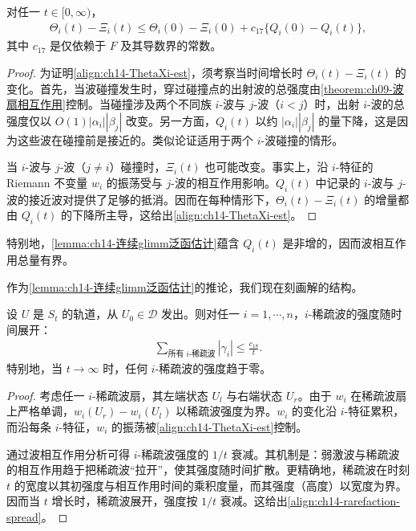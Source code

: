 \documentclass[../../main.tex]{subfiles}
\begin{document}
\begin{lemma}\label{lemma:ch14-连续glimm泛函估计}
对任一 $t\in[0,\infty)$，
\begin{align}
\Theta_i(t)-\Xi_i(t)\leqslant\Theta_i(0)-\Xi_i(0)+c_{17}\{Q_i(0)-Q_i(t)\},
\label{align:ch14-ThetaXi-est}
\end{align}
其中 $c_{17}$ 是仅依赖于 $F$ 及其导数界的常数。
\end{lemma}

\begin{proof}
为证明\eqref{align:ch14-ThetaXi-est}，须考察当时间增长时 $\Theta_i(t)-\Xi_i(t)$ 的变化。首先，当波碰撞发生时，穿过碰撞点的出射波的总强度由\cref{theorem:ch09-波扇相互作用}控制。当碰撞涉及两个不同族 $i$-波与 $j$-波（$i<j$）时，出射 $i$-波的总强度仅以 $O(1)|\alpha_i||\beta_j|$ 改变。另一方面，$Q_i(t)$ 以约 $|\alpha_i||\beta_j|$ 的量下降，这是因为这些波在碰撞前是接近的。类似论证适用于两个 $i$-波碰撞的情形。



当 $i$-波与 $j$-波（$j\neq i$）碰撞时，$\Xi_i(t)$ 也可能改变。事实上，沿 $i$-特征的 Riemann 不变量 $w_i$ 的振荡受与 $j$-波的相互作用影响。$Q_i(t)$ 中记录的 $i$-波与 $j$-波的接近波对提供了足够的抵消。因而在每种情形下，$\Theta_i(t)-\Xi_i(t)$ 的增量都由 $Q_i(t)$ 的下降所主导，这给出\eqref{align:ch14-ThetaXi-est}。
\end{proof}

特别地，\cref{lemma:ch14-连续glimm泛函估计}蕴含 $Q_i(t)$ 是非增的，因而波相互作用总量有界。

作为\cref{lemma:ch14-连续glimm泛函估计}的推论，我们现在刻画解的结构。

\begin{theorem}\label{theorem:ch14-稀疏波展开}
设 $U$ 是 $S_t$ 的轨道，从 $U_0\in\mathscr{D}$ 发出。则对任一 $i=1,\cdots,n$，$i$-稀疏波的强度随时间展开：
\begin{align}
\sum_{\text{所有 }i\text{-稀疏波}}|\gamma_i|\leqslant\frac{c_{18}}{t}.
\label{align:ch14-rarefaction-spread}
\end{align}
特别地，当 $t\to\infty$ 时，任何 $i$-稀疏波的强度趋于零。
\end{theorem}

\begin{proof}
考虑任一 $i$-稀疏波扇，其左端状态 $U_l$ 与右端状态 $U_r$。由于 $w_i$ 在稀疏波扇上严格单调，$w_i(U_r)-w_i(U_l)$ 以稀疏波强度为界。$w_i$ 的变化沿 $i$-特征累积，而沿每条 $i$-特征，$w_i$ 的振荡被\eqref{align:ch14-ThetaXi-est}控制。

通过波相互作用分析可得 $i$-稀疏波强度的 $1/t$ 衰减。其机制是：弱激波与稀疏波的相互作用趋于把稀疏波``拉开''，使其强度随时间扩散。更精确地，稀疏波在时刻 $t$ 的宽度以其初强度与相互作用时间的乘积度量，而其强度（高度）以宽度为界。因而当 $t$ 增长时，稀疏波展开，强度按 $1/t$ 衰减。这给出\eqref{align:ch14-rarefaction-spread}。
\end{proof}
\end{document}
